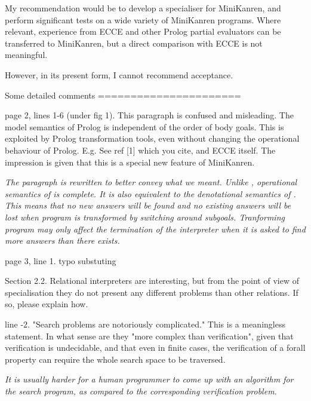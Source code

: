My recommendation would be to develop a specialiser for MiniKanren, and perform significant tests on a wide variety of MiniKanren programs.  Where relevant, experience from ECCE and other Prolog partial evaluators can be transferred to MiniKanren, but a direct comparison with ECCE is not meaningful.

However, in its present form, I cannot recommend acceptance.

Some detailed comments
======================

page 2, lines 1-6 (under fig 1).  This paragraph is confused and misleading.  The model semantics of Prolog is independent of the order of body goals.  This is exploited by Prolog transformation tools, even without changing the operational behaviour of Prolog.  E.g. See ref [1] which you cite, and ECCE itself. The impression is given that this is a special new feature of MiniKanren.

\emph{The paragraph is rewritten to better convey what we meant. Unlike \pro, operational semantics of \mk is complete. It is also equivalent to the denotational semantics of \mk. This means that no new answers will be found and no existing answers will be lost when \mk program is transformed by switching around subgoals. Tranforming \mk program may only affect the termination of the \mk interpreter when it is asked to find more answers than there exists.}

page 3, line 1.  typo substuting

  Section 2.2.  Relational interpreters are interesting, but from the point of view of specialisation they do not present any different problems than other relations.  If so, please explain how.

line -2.  "Search problems are notoriously complicated."  This is a meaningless statement.  In what sense are they "more complex than verification", given that verification is undecidable, and that even in finite cases, the verification of a forall property can require the whole search space to be traversed.

\emph{It is usually harder for a human programmer to come up with an algorithm for the search program, as compared to the corresponding verification problem.}